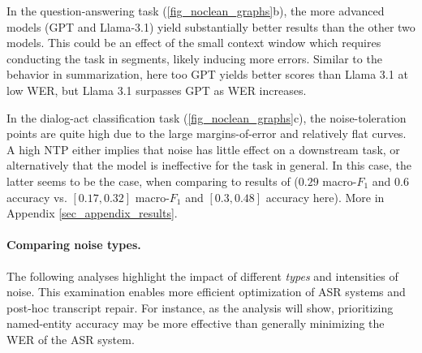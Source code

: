 In the question-answering task (\autoref{fig_noclean_graphs}b), the more advanced models (GPT and Llama-3.1) yield substantially better results than the other two models. This could be an effect of the small context window which requires conducting the task in segments, likely inducing more errors. 
Similar to the behavior in summarization, here too GPT yields better scores than Llama 3.1 at low WER, but Llama 3.1 surpasses GPT as WER increases.

In the dialog-act classification task (\autoref{fig_noclean_graphs}c), the noise-toleration points are quite high due to the large margins-of-error and relatively flat curves. A high NTP either implies that noise has little effect on a downstream task, or alternatively that the model is ineffective for the task in general.
In this case, the latter seems to be the case, when comparing to results of \citet{miah-etal-2023-hierarchical} ($0.29$ macro-$F_1$ and $0.6$ accuracy vs. $[0.17, 0.32]$ macro-$F_1$ and $[0.3, 0.48]$ accuracy here). More in Appendix \ref{sec_appendix_results}.







\paragraph{Comparing noise types.}
The following analyses highlight the impact of different \textit{types} and intensities of noise. This examination enables more efficient optimization of ASR systems and post-hoc transcript repair. For instance, as the analysis will show, prioritizing named-entity accuracy may be more effective than generally minimizing the WER of the ASR system.

